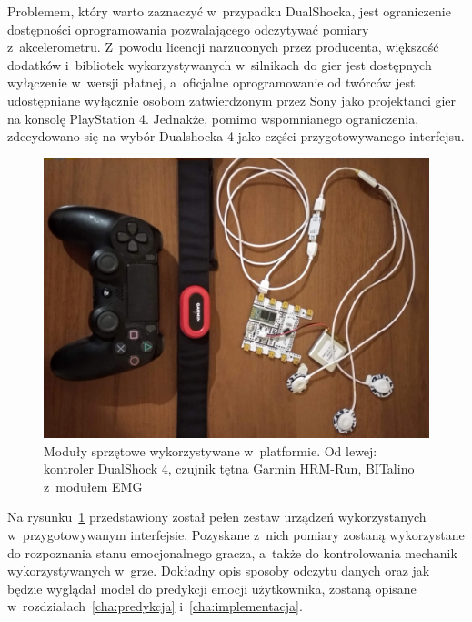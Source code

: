 Problemem, który warto zaznaczyć w~przypadku DualShocka, jest ograniczenie dostępności oprogramowania pozwalającego odczytywać pomiary z~akcelerometru. Z~powodu licencji narzuconych przez producenta, większość dodatków i~bibliotek wykorzystywanych w~silnikach do gier jest dostępnych wyłączenie w~wersji płatnej, a~oficjalne oprogramowanie od twórców jest udostępniane wyłącznie osobom zatwierdzonym przez Sony jako projektanci gier na konsolę PlayStation 4. Jednakże, pomimo wspomnianego ograniczenia, zdecydowano się na wybór Dualshocka 4 jako części przygotowywanego interfejsu.

\begin{figure}
	\centering
	\includegraphics[width=0.7\linewidth]{images/hardware.jpg}
	\caption{Moduły sprzętowe wykorzystywane w~platformie. Od lewej: kontroler DualShock 4, czujnik tętna Garmin HRM-Run, BITalino z~modułem EMG}
	\label{fig:hardware}
\end{figure}

Na rysunku~\ref{fig:hardware} przedstawiony został pełen zestaw urządzeń wykorzystanych w~przygotowywanym interfejsie. Pozyskane z~nich pomiary zostaną wykorzystane do rozpoznania stanu emocjonalnego gracza, a~także do kontrolowania mechanik wykorzystywanych w~grze. Dokładny opis sposoby odczytu danych oraz jak będzie wyglądał model do predykcji emocji użytkownika, zostaną opisane w~rozdziałach~\ref{cha:predykcja} i~\ref{cha:implementacja}.